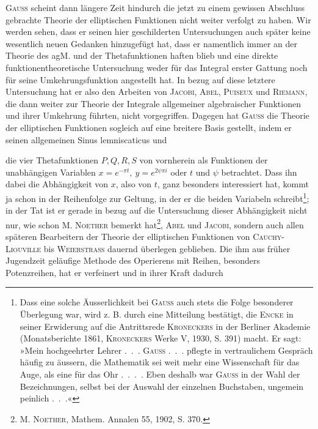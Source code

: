 \textsc{Gauss} scheint dann längere Zeit hindurch die jetzt zu einem gewissen
Abschluss gebrachte Theorie der elliptischen Funktionen nicht weiter verfolgt
zu haben. Wir werden sehen, dass er seinen hier geschilderten Untersuchungen
auch später keine wesentlich neuen Gedanken hinzugefügt hat, dass er namentlich
immer an der Theorie des agM. und der Thetafunktionen haften blieb
und eine direkte funktionentheoretische Untersuchung weder für das Integral
erster Gattung noch für seine Umkehrungsfunktion angestellt hat. In bezug
auf diese letztere Untersuchung hat er also den Arbeiten von \textsc{Jacobi}, \textsc{Abel},
\textsc{Puiseux} und \textsc{Riemann}, die dann weiter zur Theorie der Integrale allgemeiner
algebraischer Funktionen und ihrer Umkehrung führten, nicht vorgegriffen.
Dagegen hat \textsc{Gauss} die Theorie der elliptischen Funktionen sogleich auf eine
breitere Basis gestellt, indem er seinen allgemeinen Sinus lemniscaticus und\par
\clearpage{}
\noindent die vier Thetafunktionen \(P,Q,R,S\) von vornherein als Funktionen der 
unabhängigen Variablen \(x=e^{-\pi t},\ y=e^{2\psi\pi i}\) oder \(t\) und \(\psi\) betrachtet.
Dass ihn dabei die Abhängigkeit von \(x\), also von \(t\), ganz besonders interessiert
hat, kommt ja schon in der Reihenfolge zur Geltung, in der er die beiden
Variabeln schreibt\footnote{Dass eine solche Äusserlichkeit bei \textsc{Gauss} auch stets die Folge besonderer Überlegung war, wird z. B. durch eine Mitteilung bestätigt, die \textsc{Encke} in seiner Erwiderung auf die Antrittsrede \textsc{Kroneckers} in der Berliner Akademie (Monatsberichte 1861, \textsc{Kroneckers} Werke V, 1930, S. 391) macht. Er sagt: »Mein hochgeehrter Lehrer .\ .\ . \textsc{Gauss} .\ .\ . pflegte in vertraulichem Gespräch häufig zu äussern, die Mathematik sei weit mehr eine Wissenschaft für das Auge, als eine für das Ohr .\ .\ .\ . Eben deshalb war \textsc{Gauss} in der Wahl der Bezeichnungen, selbst bei der Auswahl der einzelnen Buchstaben, ungemein peinlich .\ .\ .«}; in der Tat ist er gerade in bezug auf die Untersuchung
dieser Abhängigkeit nicht nur, wie schon M. \textsc{Noether} bemerkt hat\footnote{M. \textsc{Noether}, Mathem. Annalen 55, 1902, S. 370.}, \textsc{Abel}
und \textsc{Jacobi}, sondern auch allen späteren Bearbeitern der Theorie der elliptischen
Funktionen von \textsc{Cauchy-Liouville} bis \textsc{Weierstrass} dauernd überlegen
geblieben. Die ihm aus früher Jugendzeit geläufige Methode des Operierens
mit Reihen, besonders Potenzreihen, hat er verfeinert und in ihrer Kraft dadurch
